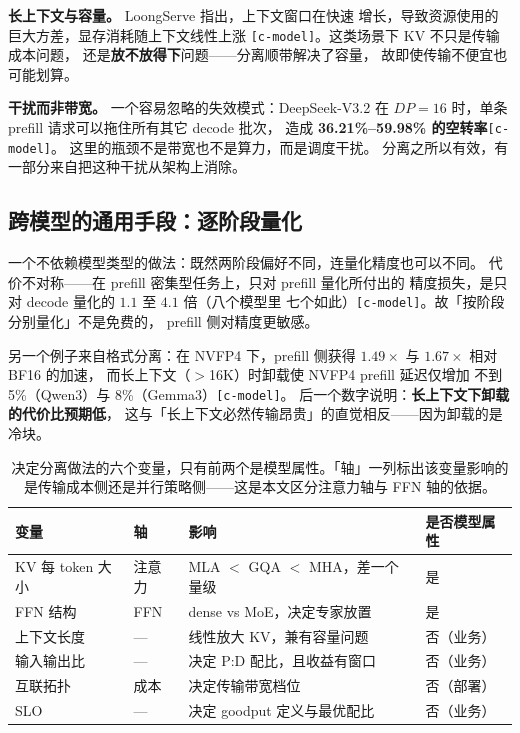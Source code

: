 \noindent\textbf{长上下文与容量。} LoongServe 指出，上下文窗口在快速
增长，导致资源使用的巨大方差，显存消耗随上下文线性上涨
\texttt{[c-model]}。这类场景下 KV 不只是传输成本问题，
还是\textbf{放不放得下}问题——分离顺带解决了容量，
故即使传输不便宜也可能划算。

\noindent\textbf{干扰而非带宽。} 一个容易忽略的失效模式：DeepSeek-V3.2
在 $DP=16$ 时，单条 prefill 请求可以拖住所有其它 decode 批次，
造成 \textbf{36.21\%--59.98\% 的空转率}\texttt{[c-model]}。
这里的瓶颈不是带宽也不是算力，而是调度干扰。
分离之所以有效，有一部分来自把这种干扰从架构上消除。

\subsection{跨模型的通用手段：逐阶段量化}

一个不依赖模型类型的做法：既然两阶段偏好不同，连量化精度也可以不同。
代价不对称——在 prefill 密集型任务上，只对 prefill 量化所付出的
精度损失，是只对 decode 量化的 $1.1$ 至 $4.1$ 倍（八个模型里
七个如此）\texttt{[c-model]}。故「按阶段分别量化」不是免费的，
prefill 侧对精度更敏感。

另一个例子来自格式分离：在 NVFP4 下，prefill 侧获得
$1.49\times$ 与 $1.67\times$ 相对 BF16 的加速，
而长上下文（$>$16K）时卸载使 NVFP4 prefill 延迟仅增加
不到 5\%（Qwen3）与 8\%（Gemma3）\texttt{[c-model]}。
后一个数字说明：\textbf{长上下文下卸载的代价比预期低}，
这与「长上下文必然传输昂贵」的直觉相反——因为卸载的是冷块。

\begin{table}[t]
\centering
\caption{决定分离做法的六个变量，只有前两个是模型属性。「轴」一列标出该变量影响的是传输成本侧还是并行策略侧——这是本文区分注意力轴与 FFN 轴的依据。}
\label{tab:model-vars}
\small
\begin{tabular}{@{}p{1.55cm}p{0.85cm}p{2.35cm}p{1.55cm}@{}}
\toprule
变量 & 轴 & 影响 & 是否模型属性 \\
\midrule
KV 每 token 大小 & 注意力 & MLA $<$ GQA $<$ MHA，差一个量级 & 是 \\
FFN 结构 & FFN & dense vs MoE，决定专家放置 & 是 \\
上下文长度 & --- & 线性放大 KV，兼有容量问题 & 否（业务） \\
输入输出比 & --- & 决定 P:D 配比，且收益有窗口 & 否（业务） \\
互联拓扑 & 成本 & 决定传输带宽档位 & 否（部署） \\
SLO & --- & 决定 goodput 定义与最优配比 & 否（业务） \\
\bottomrule
\end{tabular}
\end{table}

